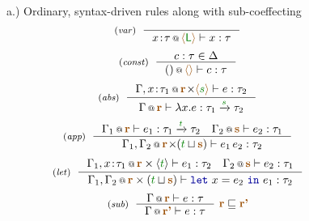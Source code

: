 \begin{figure}[t]
{\small a.) Ordinary, syntax-driven rules along with sub-coeffecting}
\begin{equation*}
\tyrule{var}{}
  {\coctx{x \!:\! \tau}{\alift{\cclrd{\ident L}}} \vdash x : \tau} 
\end{equation*}
\begin{equation*}
\tyrule{const}
  {c:\tau \in \Delta}
  {\coctx{()}{\alift{}} \vdash c : \tau} 
\end{equation*}
\begin{equation*}
\tyrule{abs}
  {\coctx{\Gamma, x \!:\! \tau_1}{\aclrd{\textbf{r}} \cons \alift{\cclrd{s}}} \vdash e : \tau_2}
  {\coctx{\Gamma}{\aclrd{\textbf{r}}} \vdash \lambda x . e : \tau_1 \xrightarrow{\cclrd{s}} \tau_2} 
\end{equation*}
\begin{equation*}
\tyrule{app}
  { \coctx{\Gamma_1}{\aclrd{\textbf{r}}} \vdash e_1 : \tau_1 \xrightarrow{\cclrd{t}} \tau_2 \quad 
    \coctx{\Gamma_2}{\aclrd{\textbf{s}}} \vdash e_2 : \tau_1}
  { \coctx{\Gamma_1, \Gamma_2}{\aclrd{\textbf{r}} \cons (\cclrd{t} \sqcup \aclrd{\textbf{s}})} \vdash e_1 \, e_2 : \tau_2} 
\end{equation*}
\begin{equation*}
\tyrule{let}
  { \coctx{\Gamma_1, x \!:\! \tau_1}{\aclrd{\textbf{r}} \times \langle{\cclrd{t}}\rangle} \vdash e_1 : \tau_2 \quad 
    \coctx{\Gamma_2}{\aclrd{\textbf{s}}} \vdash e_2 : \tau_1}
  {\coctx{\Gamma_1, \Gamma_2}{\aclrd{\textbf{r}} \times (\cclrd{t} \sqcup \aclrd{\textbf{s}})} \vdash \kvd{let}~x=e_2~\kvd{in}~e_1 : \tau_2}
\end{equation*}
\begin{equation*}
\tyrule{sub}
  {\coctx{\Gamma}{\aclrd{\textbf{r}}} \vdash e : \tau}
  {\coctx{\Gamma}{\aclrd{\textbf{r'}}} \vdash e : \tau}~\aclrd{\textbf{r}} \sqsubseteq \aclrd{\textbf{r'}}
\end{equation*}
\vspace{0.5em}


\end{figure}
